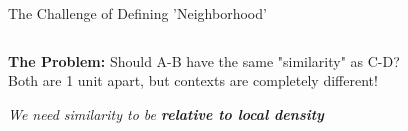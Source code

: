 \documentclass{beamer}
\begin{document}
\begin{frame}{The Challenge of Defining 'Neighborhood'}
\begin{columns}[T]
\begin{column}{0.48\textwidth}
\begin{center}
\end{center}
\end{column}
\end{columns}

\vspace{0.3cm}
\begin{center}
\colorbox{highlight!20}{
\begin{minipage}{0.85\textwidth}
\centering
\textbf{The Problem:} Should A-B have the same "similarity" as C-D?\\
\footnotesize Both are 1 unit apart, but contexts are completely different!
\end{minipage}
}
\end{center}

\vspace{0.2cm}
\begin{center}
\textit{\color{upcblue}We need similarity to be \textbf{relative to local density}}
\end{center}
\end{frame}
\end{document}
